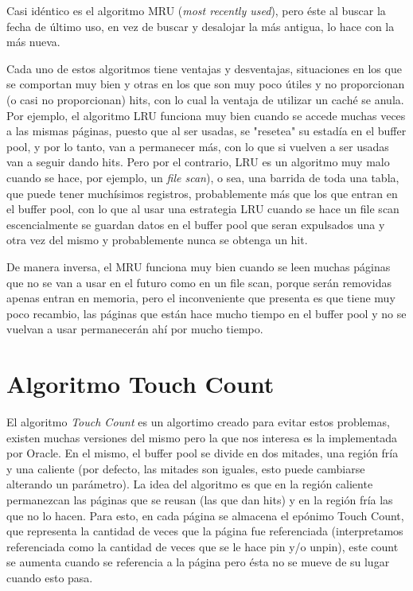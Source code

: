Casi id\'entico es el algoritmo MRU (\textit{most recently used}), pero \'este al buscar la fecha de \'ultimo uso, en vez de buscar y desalojar la m\'as antigua, lo hace con la m\'as nueva.

Cada uno de estos algoritmos tiene ventajas y desventajas, situaciones en los que se comportan muy bien y otras en los que son muy poco \'utiles y no proporcionan (o casi no proporcionan) hits, con lo cual la ventaja de utilizar un cach\'e se anula. Por ejemplo, el algoritmo LRU funciona muy bien cuando se accede muchas veces a las mismas p\'aginas, puesto que al ser usadas, se "resetea" su estad\'ia en el buffer pool, y por lo tanto, van a permanecer m\'as, con lo que si vuelven a ser usadas van a seguir dando hits. Pero por el contrario, LRU es un algoritmo muy malo cuando se hace, por ejemplo, un \textit{file scan}), o sea, una barrida de toda una tabla, que puede tener much\'isimos registros, probablemente m\'as que los que entran en el buffer pool, con lo que al usar una estrategia LRU cuando se hace un file scan escencialmente se guardan datos en el buffer pool que seran expulsados una y otra vez del mismo y probablemente nunca se obtenga un hit.

De manera inversa, el MRU funciona muy bien cuando se leen muchas p\'aginas que no se van a usar en el futuro como en un file scan, porque ser\'an removidas apenas entran en memoria, pero el inconveniente que presenta es que tiene muy poco recambio, las p\'aginas que est\'an hace mucho tiempo en el buffer pool y no se vuelvan a usar permanecer\'an ah\'i por mucho tiempo.

\section{Algoritmo Touch Count}

El algoritmo \textit{Touch Count} es un algortimo creado para evitar estos problemas, existen muchas versiones del mismo pero la que nos interesa es la implementada por Oracle. En el mismo, el buffer pool se divide en dos mitades, una regi\'on fr\'ia y una caliente (por defecto, las mitades son iguales, esto puede cambiarse alterando un par\'ametro). La idea del algoritmo es que en la regi\'on caliente permanezcan las p\'aginas que se reusan (las que dan hits) y en la regi\'on fr\'ia las que no lo hacen. Para esto, en cada p\'agina se almacena el ep\'onimo Touch Count, que representa la cantidad de veces que la p\'agina fue referenciada (interpretamos referenciada como la cantidad de veces que se le hace pin y/o unpin), este count se aumenta cuando se referencia a la p\'agina pero \'esta no se mueve de su lugar cuando esto pasa. 

